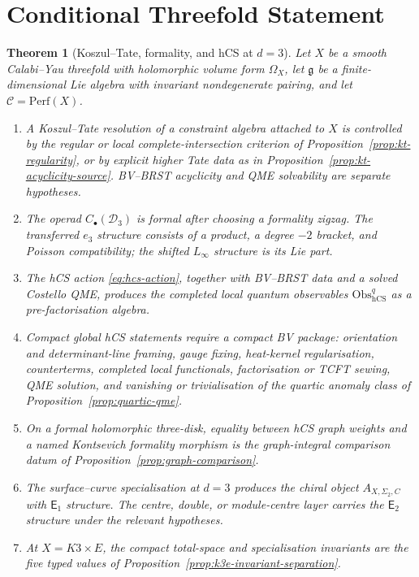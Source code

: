 \documentclass[11pt]{amsart}
\newtheorem{theorem}{Theorem}[section]
\theoremstyle{definition}
\theoremstyle{remark}
\providecommand{\Etwo}{\mathsf{E}_2}
\providecommand{\Eone}{\mathsf{E}_1}
\providecommand{\cD}{\mathcal{D}}
\providecommand{\cC}{\mathcal{C}}
\providecommand{\Linf}{L_\infty}
\providecommand{\hCS}{\mathrm{hCS}}
\providecommand{\Obs}{\mathrm{Obs}}
\providecommand{\Perf}{\mathrm{Perf}}
\providecommand{\gfrak}{\mathfrak{g}}
\begin{document}
\section{Conditional Threefold Statement}
\label{sec:conditional-threefold-statement}

\begin{theorem}[Koszul--Tate, formality, and hCS at $d=3$]
\label{thm:kt-formality-hcs-d3}
Let $X$ be a smooth Calabi--Yau threefold with holomorphic volume form
$\Omega_X$, let $\gfrak$ be a finite-dimensional Lie algebra with
invariant nondegenerate pairing, and let $\cC=\Perf(X)$.

\begin{enumerate}
\item A Koszul--Tate resolution of a constraint algebra attached to
$X$ is controlled by the regular or local complete-intersection
criterion of Proposition~\ref{prop:kt-regularity}, or by explicit
higher Tate data as in Proposition~\ref{prop:kt-acyclicity-source}.
BV--BRST acyclicity and QME solvability are separate hypotheses.

\item The operad $C_\bullet(\cD_3)$ is formal after choosing a
formality zigzag. The transferred $e_3$ structure consists of a product,
a degree $-2$ bracket, and Poisson compatibility; the shifted
$\Linf$ structure is its Lie part.

\item The hCS action \eqref{eq:hcs-action}, together with BV--BRST data
and a solved Costello QME, produces the completed local quantum
observables $\Obs^q_{\hCS}$ as a pre-factorisation algebra.

\item Compact global hCS statements require a compact BV package:
orientation and determinant-line framing, gauge fixing, heat-kernel
regularisation, counterterms, completed local functionals, factorisation
or TCFT sewing, QME solution, and vanishing or trivialisation of the quartic
anomaly class of Proposition~\ref{prop:quartic-qme}.

\item On a formal holomorphic three-disk, equality between hCS graph
weights and a named Kontsevich formality morphism is the graph-integral
comparison datum of Proposition~\ref{prop:graph-comparison}.

\item The surface--curve specialisation at $d=3$ produces the chiral
object $A_{X,\Sigma_2,C}$ with $\Eone$ structure. The centre, double, or
module-centre layer carries the $\Etwo$ structure under the relevant
hypotheses.

\item At $X=K3\times E$, the compact total-space and specialisation
invariants are the five typed values of
Proposition~\ref{prop:k3e-invariant-separation}.
\end{enumerate}
\end{theorem}
\end{document}
